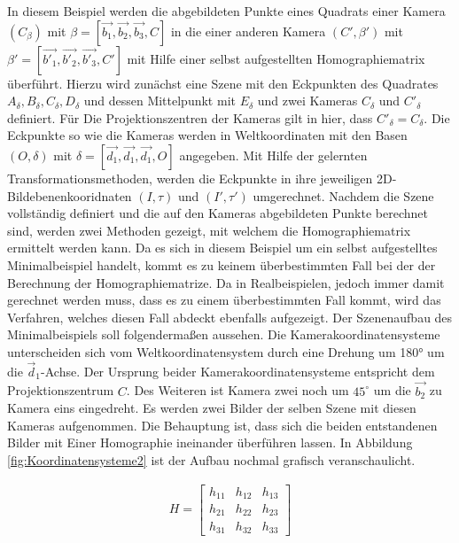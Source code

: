 In diesem Beispiel werden die abgebildeten Punkte eines Quadrats einer Kamera $(C_\beta)$ mit $\beta= [\vec{b_1},\vec{b_2},\vec{b_3},C]$ in die einer anderen Kamera $(C',\beta')$ mit $\beta'= [\vec{b'_1},\vec{b'_2},\vec{b'_3},C']$  mit Hilfe einer selbst aufgestellten Homographiematrix überführt. Hierzu wird zunächst eine Szene mit den Eckpunkten des Quadrates $A_\delta, B_\delta, C_\delta, D_\delta$ und dessen Mittelpunkt mit $E_\delta$ und zwei Kameras $C_{\delta}$ und $C'_{\delta}$ definiert. Für Die Projektionszentren der Kameras gilt in hier, dass $C'_{\delta} = C_\delta$. Die Eckpunkte so wie die Kameras werden in Weltkoordinaten mit den Basen $(O,\delta)$ mit $\delta = [\vec{d_1},\vec{d_1},\vec{d_1},O]$ angegeben. Mit Hilfe der gelernten Transformationsmethoden, werden die Eckpunkte in ihre jeweiligen 2D-Bildebenenkooridnaten $(I,\tau)$ und $(I',\tau')$ umgerechnet. Nachdem die Szene vollständig definiert und die auf den Kameras abgebildeten Punkte berechnet sind, werden zwei Methoden gezeigt, mit welchem die Homographiematrix ermittelt werden kann. Da es sich in diesem Beispiel um ein selbst aufgestelltes Minimalbeispiel handelt, kommt es zu keinem überbestimmten Fall bei der der Berechnung der Homographiematrize. Da in Realbeispielen, jedoch immer damit gerechnet werden muss, dass es zu einem überbestimmten Fall kommt, wird das Verfahren, welches diesen Fall abdeckt ebenfalls aufgezeigt. Der Szenenaufbau des Minimalbeispiels soll folgendermaßen aussehen. Die Kamerakoordinatensysteme unterscheiden sich vom Weltkoordinatensystem durch eine Drehung um 180° um die \ensuremath{\vec{d}_1}-Achse. Der Ursprung beider Kamerakoordinatensysteme entspricht dem Projektionszentrum $C$. Des Weiteren ist Kamera zwei noch um $45^\circ$ um die $\vec{b_2}$ zu Kamera eins eingedreht. Es werden zwei Bilder der selben Szene mit diesen Kameras aufgenommen. Die Behauptung ist, dass sich die beiden entstandenen Bilder mit Einer Homographie ineinander überführen lassen. In Abbildung \ref{fig:Koordinatensysteme2} ist der Aufbau nochmal grafisch veranschaulicht.

\begin{gather}
H=
\begin{bmatrix}
h_{11}&h_{12}&h_{13}\\
h_{21}&h_{22}&h_{23}\\
h_{31}&h_{32}&h_{33}
\end{bmatrix}
\end{gather}\\


